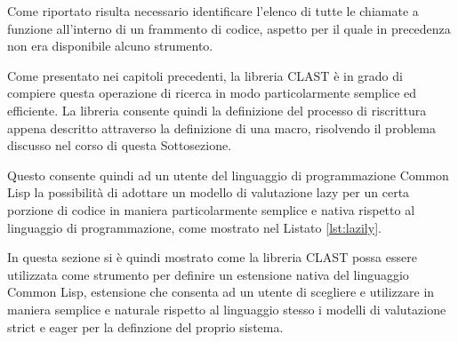 Come riportato risulta necessario identificare l'elenco di tutte le chiamate a funzione all'interno di un frammento di codice, aspetto per il quale in precedenza non era disponibile alcuno strumento.

Come presentato nei capitoli precedenti, la libreria CLAST è in grado di compiere questa operazione di ricerca in modo particolarmente semplice ed efficiente. La libreria consente quindi la definizione del processo di riscrittura appena descritto attraverso la definizione di una macro, risolvendo il problema discusso nel corso di questa Sottosezione.

Questo consente quindi ad un utente del linguaggio di programmazione Common Lisp la possibilità di adottare un modello di valutazione lazy per un certa porzione di codice in maniera particolarmente semplice e nativa rispetto al linguaggio di programmazione, come mostrato nel Listato \ref{lst:lazily}.

In questa sezione si è quindi mostrato come la libreria CLAST possa essere utilizzata come strumento per definire un estensione nativa del linguaggio Common Lisp, estensione che consenta ad un utente di scegliere e utilizzare in maniera semplice e naturale rispetto al linguaggio stesso i modelli di valutazione strict e eager per la definzione del proprio sistema.

